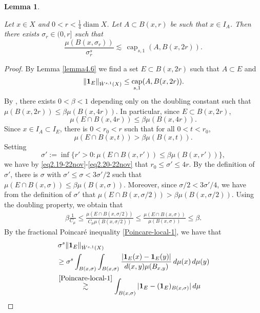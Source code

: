 \documentclass[11pt,leqno]{amsart}
\newtheorem{lemma}[theorem]{Lemma}
\numberwithin{equation}{section}
\theoremstyle{definition}
\DeclareMathOperator{\capp}{cap}
\newcommand{\caps}{\capp_{s,1}}
\DeclareMathOperator{\diam}{diam}
\begin{document}
	\begin{lemma}\label{lem4.10}
		
		
		Let 
		$x\in X$ and $0<r<\frac{1}{4}\diam X$.
		Let  $A\subset B(x,r)$ be such that  $x\in I_A$.
		Then there exists $\sigma_r\in (0,r]$ such that
		\[
		\frac{\mu(B(x,\sigma_r))}{\sigma_r^s}\lesssim \, \caps(A,B(x,2r)).
		\]
	\end{lemma}
	\begin{proof}
		By Lemma \ref{lemma4.6} we find a set $E\subset B(x,2r)$ such that $A\subset E$ and 
		\begin{align}\label{lem4.10-1}
			\|{\bf 1}_E\|_{\dot W^{s,1}(X)}\leq \caps(A,B(x,2r)).
		\end{align}
		{By \cite[Lemma 3.7]{BB11},}
		there exists $0<\beta<1$ depending only on the doubling constant such that $ \mu(B(x,2r))\leq \beta \mu(B(x,4r))$. In particular, since $E\subset B(x,2r)$,
		\begin{equation}\label{eq2.19-22nov}
			\mu(E\cap B(x,4r))\le \beta \mu(B(x,4r)).
		\end{equation}
		Since $x\in I_A\subset I_E$, there is $0<r_0<r$ such that for all $0<t<r_0$,
		\begin{equation}\label{eq2.20-22nov}
			\mu(E\cap B(x,t))>  \beta \mu(B(x,t)).
		\end{equation}
		Setting
		\[
		\sigma':=\inf\{r'>0:\mu(E\cap B(x,r'))\le \beta\mu(B(x,r'))\},
		\]
		we have by \eqref{eq2.19-22nov}-\eqref{eq2.20-22nov} that $r_0\leq\sigma'\le 4r$.
		By the definition of $\sigma'$, there is $\sigma$
		with $\sigma'\leq \sigma< 3 \sigma'/2$ 
		such that $\mu(E\cap B(x,\sigma))\le \beta\mu(B(x,\sigma))$.
		Moreover, since $\sigma/2<3\sigma'/4$, we have from the definition of $\sigma'$ that
		$\mu(E\cap B(x,\sigma/2))>  \beta \mu(B(x,\sigma/2))$.
		Using the doubling property,
		we obtain that
		\begin{align}
			\beta\frac{1}{C_{\mu}}\leq \frac{\mu(E\cap B(x,\sigma/2))}{C_{\mu}\mu(B(x,\sigma/2))} \leq \frac{\mu(E\cap B(x,\sigma))}{\mu(B(x,\sigma))}
			\leq \beta.   \label{lem4.10-2}
		\end{align}
		By the fractional Poincar\'e inequality \eqref{Poincare-local-1}, we have that
		\begin{align}
			&\, \sigma^s\|{\bf 1}_E\|_{\dot W^{s,1}(X)}\notag \\
			&\geq \sigma^s\int_{B(x, \sigma)}\int_{B(x, \sigma)}\frac{|{\bf 1}_E(x)-{\bf 1}_E(y)|}{d(x,y)\mu(B_{x,y})}\,d\mu(x)\,d\mu(y)\notag\\
			&\overset{\eqref{Poincare-local-1}}{\gtrsim} \int_{B(x,\sigma)}|{\bf 1}_E-({\bf 1}_{E})_{B(x,\sigma)}|\,d\mu\notag\\

\end{align}
\end{proof}
\end{document}
